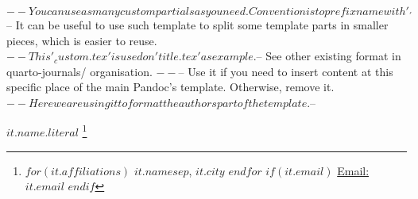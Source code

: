 $-- You can use as many custom partials as you need. Convention is to prefix name with '_'
$-- It can be useful to use such template to split some template parts in smaller pieces, which is easier to reuse. 
$-- This '_custom.tex' is used on 'title.tex' as example.
$-- See other existing format in quarto-journals/ organisation.
$-- %
$-- Use it if you need to insert content at this specific place of the main Pandoc's template. Otherwise, remove it.
$-- Here we are using it to format the authors part of the template.
$-- %

$it.name.literal$
\thanks{
  $for(it.affiliations)$
    $it.name$$sep$, $it.city$
  $endfor$
  $if(it.email)$
    \href{mailto:$it.email$}{Email: $it.email$}
  $endif$
}